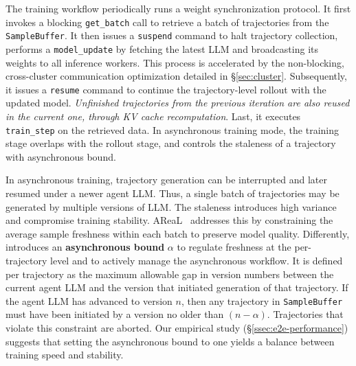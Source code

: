 The training workflow periodically runs a weight synchronization protocol. It first invokes a blocking \texttt{get\_batch} call to retrieve a batch of trajectories from the \texttt{SampleBuffer}. It then issues a \texttt{suspend} command to halt trajectory collection, performs a \texttt{model\_update} by fetching the latest LLM and broadcasting its weights to all inference workers.
This process is accelerated by the non-blocking, cross-cluster communication optimization detailed in \S\ref{sec:cluster}.
Subsequently, it issues a \texttt{resume} command to continue the trajectory-level rollout with the updated model.
\emph{Unfinished trajectories from the previous iteration are also reused in the current one, through 
KV cache recomputation}. Last, it executes \texttt{train\_step} on the retrieved data. In asynchronous training mode, the training stage overlaps with the rollout stage, and \SystemName{} controls the staleness of a trajectory with asynchronous bound.


In asynchronous training, trajectory generation can be interrupted and later resumed under a newer agent LLM. Thus, a single batch of trajectories may be generated by multiple versions of LLM. The staleness introduces high variance and compromise training stability. AReaL~\cite{areal} addresses this by constraining the average sample freshness within each batch to preserve model quality. Differently, \SystemName{} introduces an \textbf{asynchronous bound} $\alpha$ to regulate freshness at the per-trajectory level and to actively manage the asynchronous workflow. It is defined per trajectory as the maximum allowable gap in version numbers between the current agent LLM and the version that initiated generation of that trajectory. If the agent LLM has advanced to version $n$, then any trajectory in \texttt{SampleBuffer} must have been initiated by a version no older than $(n - \alpha)$. Trajectories that violate this constraint are aborted. Our empirical study (\S\ref{ssec:e2e-performance}) suggests that setting the asynchronous bound to one yields a balance between training speed and stability.

